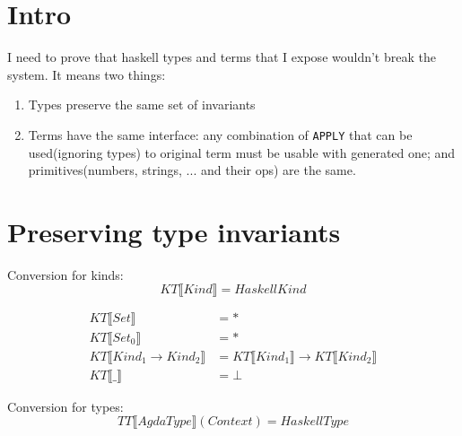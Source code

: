 \section{Intro}

I need to prove that haskell types and terms that I expose wouldn't break the system.  It means two things:
\begin{enumerate}
\item Types preserve the same set of invariants
\item Terms have the same interface: any combination of \texttt{APPLY} that can be used(ignoring types) to original
      term must be usable with generated one; and primitives(numbers, strings, ... and their ops) are the same.
\end{enumerate}

\section{Preserving type invariants}

Conversion for kinds:
\[ KT\llbracket Kind \rrbracket = HaskellKind \]

\begin{align*}
   KT\llbracket Set \rrbracket &= *\\
   KT\llbracket Set_0 \rrbracket &= *\\
   KT\llbracket Kind_1 \rightarrow Kind_2 \rrbracket &=
      KT\llbracket Kind_1 \rrbracket \rightarrow KT\llbracket Kind_2 \rrbracket\\
   KT\llbracket \_ \rrbracket &= \bot
\end{align*}

Conversion for types:
\[ TT\llbracket AgdaType \rrbracket(Context) = HaskellType \]

